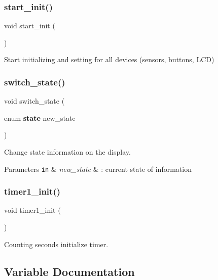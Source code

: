 \subsubsection{start\+\_\+init()}
{\footnotesize\ttfamily void start\+\_\+init (\begin{DoxyParamCaption}{ }\end{DoxyParamCaption})}



Start initializing and setting for all devices (sensors, buttons, L\+CD) 

\mbox{\label{main_8c_a8374bc374290950e43f07ed443108f9f}} 
\subsubsection{switch\+\_\+state()}
{\footnotesize\ttfamily void switch\+\_\+state (\begin{DoxyParamCaption}\item[{enum \textbf{ state}}]{new\+\_\+state }\end{DoxyParamCaption})}



Change state information on the display. 


\begin{DoxyParams}[1]{Parameters}
\mbox{\tt in}  & {\em new\+\_\+state} & \+: current state of information \\
\hline
\end{DoxyParams}
\mbox{\label{main_8c_abb302081b7dbd40d0fea4bbe53fd9b7b}} 
\subsubsection{timer1\+\_\+init()}
{\footnotesize\ttfamily void timer1\+\_\+init (\begin{DoxyParamCaption}{ }\end{DoxyParamCaption})}



Counting seconds initialize timer. 



\subsection{Variable Documentation}
\mbox{\label{main_8c_a3a4c627bf898e6ac1181089dde7282e1}} 

